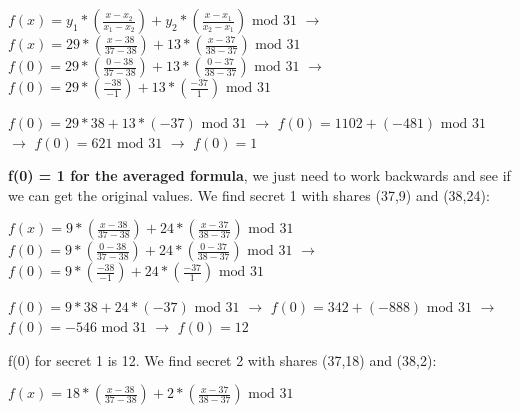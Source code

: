 \documentclass[10pt]{article}
\begin{document}
$f(x) = y_1*\left(\frac{x - x_2}{x_1 - x_2}\right) + y_2*\left(\frac{x - x_1}{x_2 - x_1}\right) \textrm{ mod } 31$ 
$\rightarrow$
$f(x) = 29*\left(\frac{x - 38}{37 - 38}\right) + 13*\left(\frac{x - 37}{38 - 37}\right) \textrm{ mod } 31$\\


$f(0) = 29*\left(\frac{0 - 38}{37 - 38}\right) + 13*\left(\frac{0 - 37}{38 - 37}\right) \textrm{ mod } 31$
$\rightarrow$
$f(0) = 29*\left(\frac{-38}{-1}\right) + 13*\left(\frac{-37}{1}\right)  \textrm{ mod } 31$
\vspace{0.1in}

$f(0) = 29*38 + 13*(-37)  \textrm{ mod } 31$
$\rightarrow$
$f(0) = 1102 + (-481)  \textrm{ mod } 31$
$\rightarrow$
$f(0) = 621  \textrm{ mod } 31$
$\rightarrow$
$f(0) = 1$

\vspace{0.1in}
\noindent \textbf{f(0) = 1 for the averaged formula}, we just need to work backwards and see if we can get the original values. We find secret 1 with shares (37,9) and (38,24):\\ \vspace{0.1in}

$f(x) = 9*\left(\frac{x - 38}{37 - 38}\right) + 24*\left(\frac{x - 37}{38 - 37}\right) \textrm{ mod } 31$\\


$f(0) = 9*\left(\frac{0 - 38}{37 - 38}\right) + 24*\left(\frac{0 - 37}{38 - 37}\right) \textrm{ mod } 31$
$\rightarrow$
$f(0) = 9*\left(\frac{-38}{-1}\right) + 24*\left(\frac{-37}{1}\right)  \textrm{ mod } 31$
\vspace{0.1in}

$f(0) = 9*38 + 24*(-37)  \textrm{ mod } 31$
$\rightarrow$
$f(0) = 342 + (-888)  \textrm{ mod } 31$
$\rightarrow$
$f(0) = -546  \textrm{ mod } 31$
$\rightarrow$
$f(0) = 12$
\vspace{0.15in}

\noindent f(0) for secret 1 is 12.  We find secret 2 with shares (37,18) and (38,2):\\ \vspace{0.1in}

$f(x) = 18*\left(\frac{x - 38}{37 - 38}\right) + 2*\left(\frac{x - 37}{38 - 37}\right) \textrm{ mod } 31$\\
\end{document}
